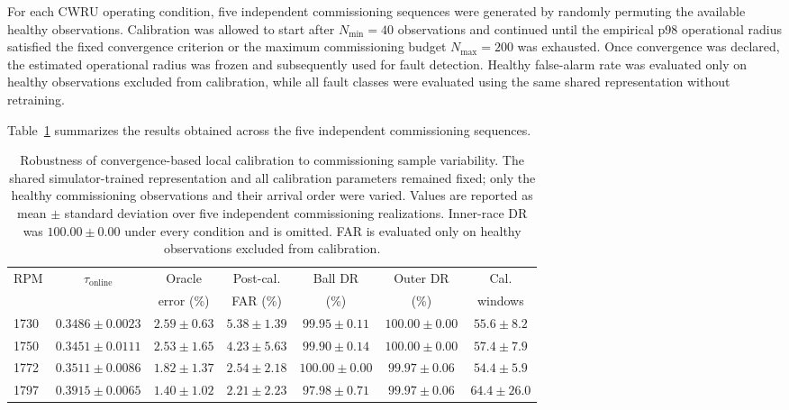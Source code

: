 \documentclass[numbered]{trbunofficial}
\begin{document}
For each CWRU operating condition, five independent commissioning sequences
were generated by randomly permuting the available healthy observations.
Calibration was allowed to start after $N_{\min}=40$ observations and
continued until the empirical p98 operational radius satisfied the fixed
convergence criterion or the maximum commissioning budget
$N_{\max}=200$ was exhausted. Once convergence was declared, the estimated
operational radius was frozen and subsequently used for fault detection.
Healthy false-alarm rate was evaluated only on healthy observations excluded
from calibration, while all fault classes were evaluated using the same
shared representation without retraining.

Table~\ref{tab:initialization-robustness} summarizes the results obtained
across the five independent commissioning sequences.
\begin{table}[!ht]
\centering
\caption{Robustness of convergence-based local calibration to commissioning
sample variability. The shared simulator-trained representation and all
calibration parameters remained fixed; only the healthy commissioning
observations and their arrival order were varied. Values are reported as
mean $\pm$ standard deviation over five independent commissioning
realizations. Inner-race DR was $100.00 \pm 0.00$ under every condition and
is omitted. FAR is evaluated only on healthy observations excluded from
calibration.}
\label{tab:initialization-robustness}
\setlength{\tabcolsep}{5pt}
\begin{tabular}{@{}lcccccc@{}}
\toprule
RPM & $\tau_{\mathrm{online}}$ & Oracle    & Post-cal. & Ball DR & Outer DR & Cal.    \\
    &                          & error (\%) & FAR (\%)  & (\%)    & (\%)     & windows \\
\midrule

1730 & $0.3486 \pm 0.0023$ & $2.59 \pm 0.63$ & $5.38 \pm 1.39$
     & $99.95 \pm 0.11$ & $100.00 \pm 0.00$ & $55.6 \pm 8.2$ \\

1750 & $0.3451 \pm 0.0111$ & $2.53 \pm 1.65$ & $4.23 \pm 5.63$
     & $99.90 \pm 0.14$ & $100.00 \pm 0.00$ & $57.4 \pm 7.9$ \\

1772 & $0.3511 \pm 0.0086$ & $1.82 \pm 1.37$ & $2.54 \pm 2.18$
     & $100.00 \pm 0.00$ & $99.97 \pm 0.06$ & $54.4 \pm 5.9$ \\

1797 & $0.3915 \pm 0.0065$ & $1.40 \pm 1.02$ & $2.21 \pm 2.23$
     & $97.98 \pm 0.71$ & $99.97 \pm 0.06$ & $64.4 \pm 26.0$ \\

\bottomrule
\end{tabular}
\end{table}
\end{document}
